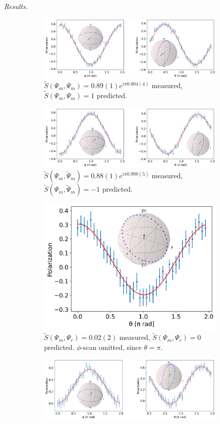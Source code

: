 \documentclass[a4paper,twocolumn,11pt]{quantumarticle}
\begin{document}
\emph{Results.}
\begin{figure}
    \centering
    \begin{subfigure}{\textwidth}
        \centering
        \includegraphics[width=0.7\linewidth]{Figures/flav_s_plus.pdf}
        \caption{$\tilde{S}(\Psi_m, \Psi_m) = 0.89(1) e^{i\pi 0.004(4)}$ measured, $\tilde S(\Psi_m, \Psi_m) = 1$ predicted.}
        \label{fig:flav_cond_res_plus}
    \end{subfigure}
        \begin{subfigure}{\textwidth}
        \centering
        \includegraphics[width=0.7\linewidth]{Figures/flav_s_minus.pdf}
        \caption{$\tilde{S}(\Psi_m, \tilde{\Psi}_m) = 0.88(1)e^{i\pi 0.998(5)}$ measured, $\tilde S(\Psi_m, \tilde{\Psi}_m) = -1$ predicted.}
        \label{fig:flav_cond_res_minus}
    \end{subfigure}
    \begin{subfigure}{\textwidth}
        \centering
        \includegraphics[width=0.35\linewidth]{Figures/flav_s_zero.pdf}
        \caption{$\tilde{S}(\Psi_m, \Psi_r) = 0.02(2)$ measured, $\tilde S(\Psi_m, \Psi_r) = 0$ predicted. $\phi$-scan omitted, since $\theta=\pi$.}
        \label{fig:flav_cond_res_zero}
    \end{subfigure}
        \begin{subfigure}{\textwidth}
     \centering
        \includegraphics[width=0.7\linewidth]{Figures/exist_s_minus.pdf}

\end{subfigure}
\end{figure}
\end{document}
